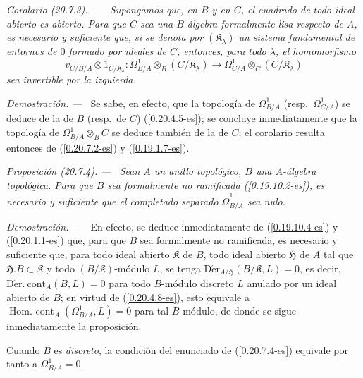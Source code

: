 \documentclass[10pt,oneside]{book}
\makeatletter
\newcommand{\sref}[1]{\textup{(\ref{#1})}}
\newcommand{\setmanualcurrentlabel}[1]{\def\@currentlabel{#1}}
\newenvironment{proposition}[1][]{%
  \setmanualcurrentlabel{#1}\par\medskip\noindent\itshape Proposición (#1). ---\ }{\par}
\newenvironment{corollary}[1][]{%
  \setmanualcurrentlabel{#1}\par\medskip\noindent\itshape Corolario (#1). ---\ }{\par}
\newenvironment{proof}{%
  \par\medskip\noindent\textit{Demostración. ---\ }}{\par}
\makeatother
\begin{document}
\begin{corollary}[20.7.3]
\label{0.20.7.3-es}
Supongamos que, en $B$ y en $C$, el cuadrado de todo ideal abierto es abierto.
Para que $C$ sea una $B$-álgebra formalmente lisa respecto de $A$, es
necesario y suficiente que, si se denota por $(\mathfrak K_\lambda)$ un sistema
fundamental de entornos de $0$ formado por ideales de $C$, entonces, para todo
$\lambda$, el homomorfismo
\begin{equation}
\tag{20.7.3.1}
\label{0.20.7.3.1-es}
  v_{C/B/A}\otimes 1_{C/\mathfrak K_\lambda}:
  \Omega^1_{B/A}\otimes_B(C/\mathfrak K_\lambda)\to
  \Omega^1_{C/A}\otimes_C(C/\mathfrak K_\lambda)
\end{equation}
sea invertible por la izquierda.
\end{corollary}

\begin{proof}
Se sabe, en efecto, que la topología de $\Omega^1_{B/A}$ (resp.\
$\Omega^1_{C/A}$) se deduce de la de $B$ (resp.\ de $C$)
\sref{0.20.4.5-es}; se concluye inmediatamente que la topología de
$\Omega^1_{B/A}\otimes_B C$ se deduce también de la de $C$; el corolario
resulta entonces de \sref{0.20.7.2-es} y \sref{0.19.1.7-es}.
\end{proof}

\begin{proposition}[20.7.4]
\label{0.20.7.4-es}
Sean $A$ un anillo topológico, $B$ una $A$-álgebra topológica. Para que
$B$ sea formalmente no ramificada \textup{\sref{0.19.10.2-es}}, es necesario y suficiente
que el completado separado $\widehat{\Omega}^1_{B/A}$ sea nulo.
\end{proposition}

\begin{proof}
En efecto, se deduce inmediatamente de \sref{0.19.10.4-es} y
\sref{0.20.1.1-es} que, para que $B$ sea formalmente no ramificada, es necesario y
suficiente que, para todo ideal abierto $\mathfrak K$ de $B$, todo ideal abierto
$\mathfrak{H}$ de $A$ tal que $\mathfrak H.B\subset\mathfrak K$ y todo
$(B/\mathfrak K)$-módulo $L$, se tenga
$\operatorname{D\acute{e}r}_{A/\mathfrak{H}}(B/\mathfrak K,L)=0$,
es decir, $\operatorname{D\acute{e}r.\ cont}_A(B,L)=0$ para todo
$B$-módulo discreto $L$ anulado por un ideal abierto de $B$; en virtud de
\sref{0.20.4.8-es}, esto equivale a
$\operatorname{Hom.\ cont}_A(\Omega^1_{B/A},L)=0$ para tal $B$-módulo,
de donde se sigue inmediatamente la proposición.

Cuando $B$ es \emph{discreto}, la condición del enunciado de
\sref{0.20.7.4-es} equivale por tanto a $\Omega^1_{B/A}=0$.
\end{proof}
\end{document}
